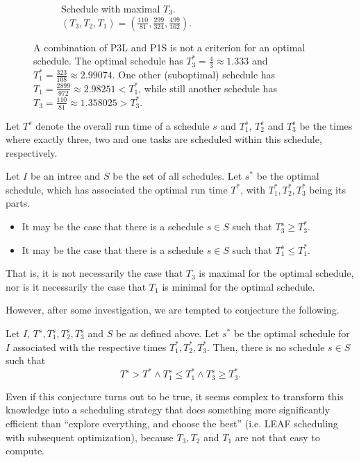 \begin{figure}[ht]
\begin{subfigure}{.3\linewidth}
    \caption{Schedule with maximal $T_3$. $(T_3,T_2,T_1)=(\frac{110}{81},\frac{299}{324},\frac{499}{162})$.}
  \end{subfigure}
  \caption{A combination of P3L and P1S is not a criterion for an optimal schedule. The optimal schedule has $T_3^*=\frac{4}{3}\approx 1.333$ and $T_1^*=\frac{323}{108}\approx 2.99074$. One other (suboptimal) schedule has $T_1=\frac{2899}{972}\approx 2.98251 < T_1^*$, while still another schedule has $T_3=\frac{110}{81}\approx1.358025 > T_3^*$.}
  \label{fig:p3l-p1s-combo-suboptimal}
\end{figure}

\begin{corollary}
  Let $T^s$ denote the overall run time of a schedule $s$ and $T_1^s$, $T_2^s$ and $T_3^s$ be the times where exactly three, two and one tasks are scheduled within this schedule, respectively.

  Let $I$ be an intree and $S$ be the set of all schedules. Let $s^*$ be the optimal schedule, which has associated the optimal run time $T^*$, with $T_1^*, T_2^*, T_3^*$ being its parts.
  \begin{itemize}
  \item It may be the case that there is a schedule $s\in S$ such that $T_3^s \geq T_3^*$.
  \item It may be the case that there is a schedule $s\in S$ such that $T_1^s \leq T_1^*$.
  \end{itemize}
\end{corollary}

That is, it is not necessarily the case that $T_3$ is maximal for the optimal schedule, nor is it necessarily the case that $T_1$ is minimal for the optimal schedule.

However, after some investigation, we are tempted to conjecture the following.

\begin{conjecture}
  Let $I$, $T^s, T_1^s, T_2^s, T_3^s$ and $S$ be as defined above. Let $s^*$ be the optimal schedule for $I$ associated with the respective times $T_1^*, T_2^*, T_3^*$. Then, there is no schedule $s\in S$ such that
  \begin{equation*}
    T^s > T^* \wedge T_1^s \leq T_1^* \wedge T_3^s \geq T_3^*.
  \end{equation*}
\end{conjecture}

Even if this conjecture turns out to be true, it seems complex to transform this knowledge into a scheduling strategy that does something more significantly efficient than ``explore everything, and choose the best'' (i.e. LEAF scheduling with subsequent optimization), because $T_3, T_2$ and $T_1$ are not that easy to compute.

